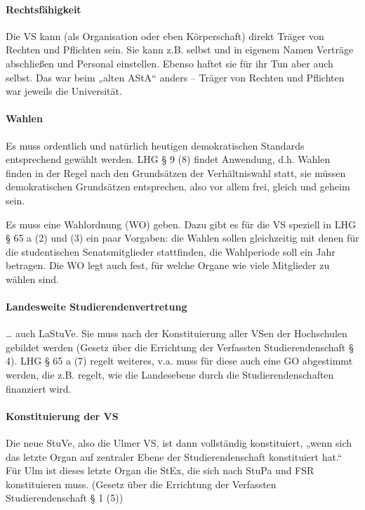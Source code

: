 \documentclass[
10pt,
a4paper,
twoside,								%
titlepage=false,							%
draft=false								%
]{scrartcl}
\begin{document}
\paragraph{Rechtsfähigkeit}

Die VS kann (als Organisation oder eben Körperschaft) direkt Träger von Rechten und Pflichten sein. Sie kann z.B. selbst und in eigenem Namen Verträge abschließen und Personal einstellen. Ebenso haftet sie für ihr Tun aber auch selbst. Das war beim „alten AStA“ anders – Träger von Rechten und Pflichten war jeweils die Universität.



\paragraph{Wahlen}

Es muss ordentlich und natürlich heutigen demokratischen Standards entsprechend gewählt werden. LHG § 9 (8) findet Anwendung, d.h. Wahlen finden in der Regel nach den Grundsätzen der Verhältniswahl statt, sie müssen demokratischen Grundsätzen entsprechen, also vor allem frei, gleich und geheim sein.

Es muss eine Wahlordnung (WO) geben. Dazu gibt es für die VS speziell in LHG § 65 a (2) und (3) ein paar Vorgaben: die Wahlen sollen gleichzeitig mit denen für die studentischen Senatsmitglieder stattfinden, die Wahlperiode soll ein Jahr betragen. Die WO legt auch fest, für welche Organe wie viele Mitglieder zu wählen sind.



\paragraph{Landesweite Studierendenvertretung}

… auch LaStuVe. Sie muss nach der Konstituierung aller VSen der Hochschulen gebildet werden (Gesetz über die Errichtung der Verfassten Studierendenschaft § 4). LHG § 65 a (7) regelt weiteres, v.a. muss für diese auch eine GO abgestimmt werden, die z.B. regelt, wie die Landesebene durch die Studierendenschaften finanziert wird.


\paragraph{Konstituierung der VS}

Die neue StuVe, also die Ulmer VS, ist dann vollständig konstituiert, „wenn sich das letzte Organ auf zentraler Ebene der Studierendenschaft konstituiert hat.“ Für Ulm ist dieses letzte Organ die StEx, die sich nach StuPa und FSR konstituieren muss. (Gesetz über die Errichtung der Verfassten Studierendenschaft § 1 (5))
\end{document}
